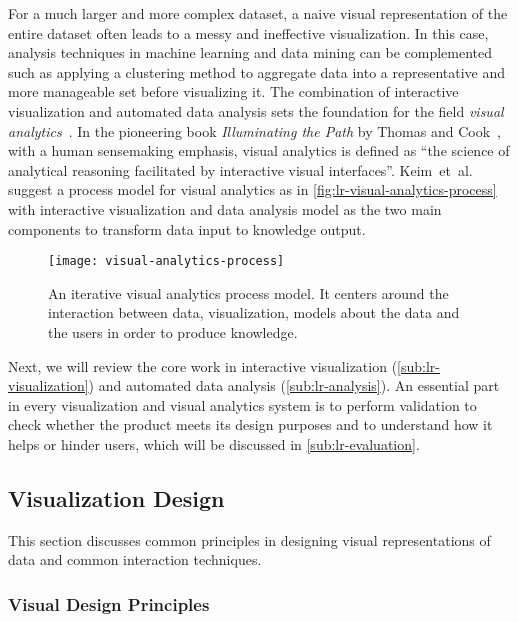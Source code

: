 For a much larger and more complex dataset, a naive visual representation of the entire dataset often leads to a messy and ineffective visualization. In this case, analysis techniques in machine learning and data mining can be complemented such as applying a clustering method to aggregate data into a representative and more manageable set before visualizing it. The combination of interactive visualization and automated data analysis sets the foundation for the field \emph{visual analytics}~\cite{Keim2008}. In the pioneering book \emph{Illuminating the Path} by Thomas and Cook~\cite{Thomas2005}, with a human sensemaking emphasis, visual analytics is defined as ``the science of analytical reasoning facilitated by interactive visual interfaces''. Keim~et~al.~\cite{Keim2010} suggest a process model for visual analytics as in \autoref{fig:lr-visual-analytics-process} with interactive visualization and data analysis model as the two main components to transform data input to knowledge output.

\begin{figure}
	\centering
	\texttt{[image: visual-analytics-process]}
	\caption[An iterative visual analytics process model]{An iterative visual analytics process model. It centers around the interaction between data, visualization, models about the data and the users in order to produce knowledge. }
	\label{fig:lr-visual-analytics-process}
\end{figure}

Next, we will review the core work in interactive visualization (\autoref{sub:lr-visualization}) and automated data analysis (\autoref{sub:lr-analysis}). An essential part in every visualization and visual analytics system is to perform validation to check whether the product meets its design purposes and to understand how it helps or hinder users, which will be discussed in \autoref{sub:lr-evaluation}.

\subsection{Visualization Design}
\label{sub:lr-visualization}

This section discusses common principles in designing visual representations of data and common interaction techniques.

\subsubsection{Visual Design Principles}
\label{sub:lr-design}

